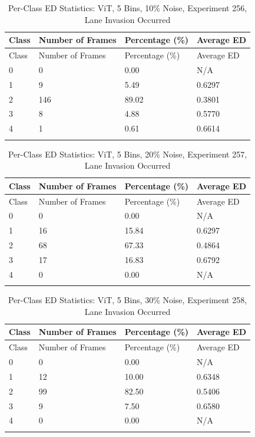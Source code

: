 
\begin{longtable}{@{}llll@{}}
\toprule
Class & Number of Frames & Percentage (\%) & Average ED \\
\midrule
\endfirsthead
\toprule
Class & Number of Frames & Percentage (\%) & Average ED \\
\midrule
\endhead
0 & 0 & 0.00 & N/A \\
1 & 9 & 5.49 & 0.6297 \\
2 & 146 & 89.02 & 0.3801 \\
3 & 8 & 4.88 & 0.5770 \\
4 & 1 & 0.61 & 0.6614 \\
\bottomrule
\caption{Per-Class ED Statistics: ViT, 5 Bins, 10\% Noise, Experiment 256, Lane Invasion Occurred}
\label{tab:exp256_ViT_5bins_10noise}
\end{longtable}
        


\begin{longtable}{@{}llll@{}}
\toprule
Class & Number of Frames & Percentage (\%) & Average ED \\
\midrule
\endfirsthead
\toprule
Class & Number of Frames & Percentage (\%) & Average ED \\
\midrule
\endhead
0 & 0 & 0.00 & N/A \\
1 & 16 & 15.84 & 0.6297 \\
2 & 68 & 67.33 & 0.4864 \\
3 & 17 & 16.83 & 0.6792 \\
4 & 0 & 0.00 & N/A \\
\bottomrule
\caption{Per-Class ED Statistics: ViT, 5 Bins, 20\% Noise, Experiment 257, Lane Invasion Occurred}
\label{tab:exp257_ViT_5bins_20noise}
\end{longtable}
        


\begin{longtable}{@{}llll@{}}
\toprule
Class & Number of Frames & Percentage (\%) & Average ED \\
\midrule
\endfirsthead
\toprule
Class & Number of Frames & Percentage (\%) & Average ED \\
\midrule
\endhead
0 & 0 & 0.00 & N/A \\
1 & 12 & 10.00 & 0.6348 \\
2 & 99 & 82.50 & 0.5406 \\
3 & 9 & 7.50 & 0.6580 \\
4 & 0 & 0.00 & N/A \\
\bottomrule
\caption{Per-Class ED Statistics: ViT, 5 Bins, 30\% Noise, Experiment 258, Lane Invasion Occurred}
\label{tab:exp258_ViT_5bins_30noise}
\end{longtable}
        

